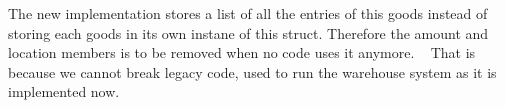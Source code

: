 
\begin{DoxyRefList}
\item[\label{deprecated__deprecated000001}%
\hypertarget{deprecated__deprecated000001}{}%
Class \hyperlink{struct__ware__}{\+\_\+ware\+\_\+} ]The new implementation stores a list of all the entries of this goods instead of storing each goods in its own instane of this struct. Therefore the amount and location members is to be removed when no code uses it anymore. ~\newline
 That is because we cannot break legacy code, used to run the warehouse system as it is implemented now. 
\end{DoxyRefList}